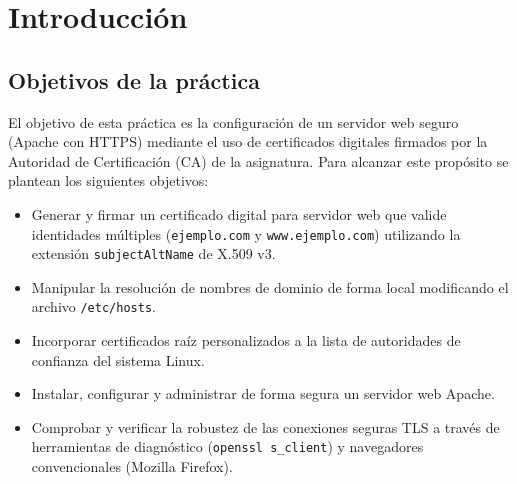 \chapter{Introducción}

\section{Objetivos de la práctica}
El objetivo de esta práctica es la configuración 
de un servidor web seguro (Apache con HTTPS) 
mediante el uso de certificados digitales 
firmados por la Autoridad de Certificación 
(CA) de la asignatura. Para alcanzar este 
propósito se plantean los siguientes objetivos:
\begin{itemize}
    \item Generar y firmar un certificado digital para servidor web que valide identidades múltiples (\texttt{ejemplo.com} y \texttt{www.ejemplo.com}) utilizando la extensión \texttt{subjectAltName} de X.509 v3.
    \item Manipular la resolución de nombres de dominio de forma local modificando el archivo \texttt{/etc/hosts}.
    \item Incorporar certificados raíz personalizados a la lista de autoridades de confianza del sistema Linux.
    \item Instalar, configurar y administrar de forma segura un servidor web Apache.
    \item Comprobar y verificar la robustez de las conexiones seguras TLS a través de herramientas de diagnóstico (\texttt{openssl s\_client}) y navegadores convencionales (Mozilla Firefox).
\end{itemize}

